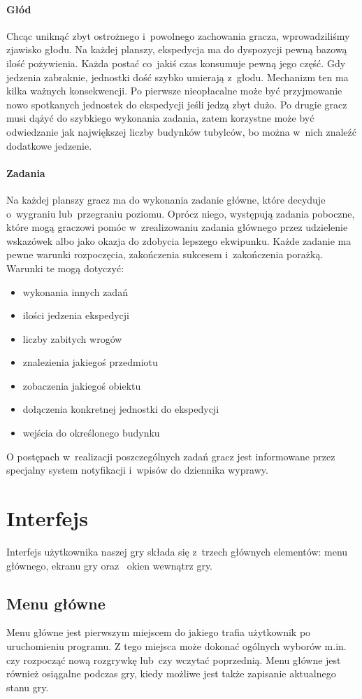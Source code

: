\documentclass[licencjacka]{pracamgr}
\begin{document}
      \paragraph{Głód}
	Chcąc uniknąć zbyt ostrożnego i~powolnego zachowania gracza, wprowadziliśmy zjawisko głodu. Na każdej planszy, ekspedycja ma do dyspozycji pewną
	bazową ilość pożywienia. Każda postać co~jakiś czas konsumuje pewną jego część. Gdy jedzenia zabraknie, jednostki dość szybko
	umierają z~głodu. Mechanizm ten ma kilka ważnych konsekwencji. Po pierwsze nieopłacalne może być przyjmowanie nowo spotkanych jednostek do ekspedycji
	jeśli jedzą zbyt dużo. Po drugie gracz musi dążyć do szybkiego wykonania zadania, zatem korzystne może być odwiedzanie jak największej liczby budynków
	tubylców, bo można w~nich znaleźć dodatkowe jedzenie.
      \paragraph{Zadania}
	Na każdej planszy gracz ma do wykonania zadanie główne, które decyduje o~wygraniu lub~przegraniu poziomu. Oprócz niego,
	występują zadania poboczne, które mogą graczowi pomóc w~zrealizowaniu zadania głównego przez udzielenie wskazówek albo jako okazja do zdobycia lepszego
	ekwipunku. Każde zadanie ma pewne warunki rozpoczęcia, zakończenia sukcesem i~zakończenia porażką. Warunki te mogą dotyczyć:
	\begin{itemize}
	 \item wykonania innych zadań
	 \item ilości jedzenia ekspedycji
	 \item liczby zabitych wrogów
	 \item znalezienia jakiegoś przedmiotu
	 \item zobaczenia jakiegoś obiektu
	 \item dołączenia konkretnej jednostki do ekspedycji
	 \item wejścia do określonego budynku
	\end{itemize}
	O postępach w~realizacji poszczególnych zadań gracz jest informowane przez specjalny system notyfikacji i~wpisów do dziennika wyprawy.


  \section{Interfejs}
    Interfejs użytkownika naszej gry składa się z~trzech głównych elementów: menu głównego, ekranu gry oraz~ okien wewnątrz gry.

    \subsection{Menu główne}
      Menu główne jest pierwszym miejscem do jakiego trafia użytkownik po uruchomieniu programu. Z tego miejsca może dokonać ogólnych wyborów m.in. czy
      rozpocząć nową rozgrywkę lub~czy wczytać poprzednią. Menu główne jest również osiągalne podczas gry, kiedy możliwe jest także zapisanie aktualnego stanu gry.
\end{document}

